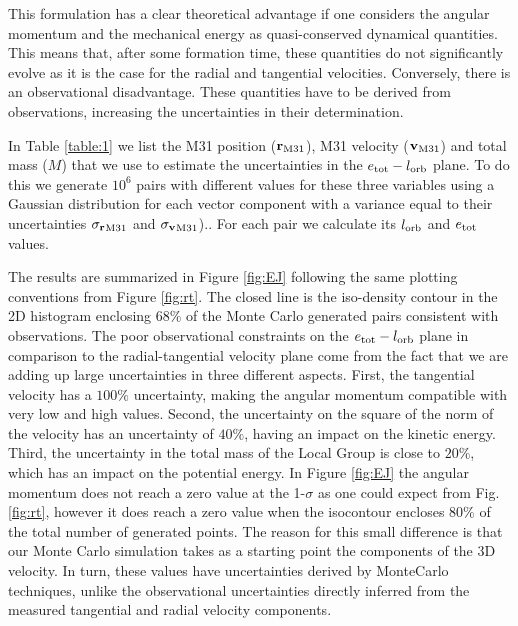 \documentclass{emulateapj}
\begin{document}
This formulation has a clear theoretical advantage if one considers the angular momentum and the mechanical energy as quasi-conserved dynamical quantities. This means that, after some formation time, these quantities do not significantly evolve as it is the case for the radial and tangential velocities. Conversely, there is an observational disadvantage. These quantities have to be derived from observations, increasing the uncertainties in their determination.

In Table \ref{table:1} we list the M31 position (${\bf r}_{\rm M31}$), M31 velocity (${\bf v}_{\rm M31}$) and total mass ($M$) that we use to estimate the uncertainties in the $e_{\rm tot}-l_{\rm orb}$ plane. To do this we generate $10^6$ pairs with different values for these three variables using a Gaussian distribution for each vector component with a variance equal to their uncertainties ${\sigma_{\bf r}}_{\rm M31}$ and ${\sigma_{\bf v}}_{\rm M31}$).. For each pair we calculate its $l_{\rm orb}$ and $e_{\rm tot}$ values.  

The results are summarized in Figure \ref{fig:EJ} following the same plotting conventions from Figure \ref{fig:rt}. The closed line is the iso-density contour in the 2D histogram enclosing $68\%$ of the Monte Carlo generated pairs consistent with observations. The poor observational constraints on the $e_{\rm tot}-l_{\rm orb}$ plane in comparison to the radial-tangential velocity plane come from the fact that we are adding up large uncertainties in three different aspects. First, the tangential velocity has a $100\%$ uncertainty, making the angular momentum compatible with very low and high values. Second, the uncertainty on the square of the norm of the velocity has an uncertainty of $40\%$, having an impact on the kinetic energy. Third, the uncertainty in the total mass of the Local Group is close to $20\%$, which has an impact on the potential energy. In Figure \ref{fig:EJ} the angular momentum does not reach a zero value at the 1-$\sigma$ as one could expect from Fig. \ref{fig:rt}, however it does reach a zero value when the isocontour encloses $80\%$ of the total number of generated points. The reason for this small difference is that our Monte Carlo simulation takes as a starting point the components of the 3D velocity. In turn, these values have uncertainties derived by MonteCarlo techniques, unlike the observational uncertainties directly inferred from the measured tangential and radial velocity components.
\end{document}
